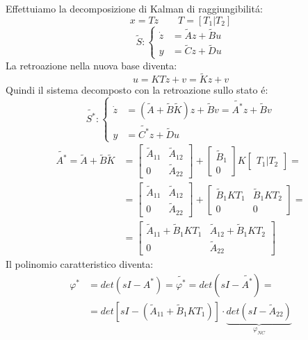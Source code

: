 \documentclass[../main.tex]{subfiles}
\begin{document}
		Effettuiamo la decomposizione di Kalman di raggiungibilit\'a:
		\[ x = Tz \qquad T = [T_1 | T_2] \]
		\[
			\tilde S:
			\begin{cases}
				\dot z &= \tilde Az + \tilde Bu\\
				y &= \tilde Cz + \tilde Du
			\end{cases}
		\]
		La retroazione nella nuova base diventa:
		\[ u = KTz + v = \tilde Kz + v \]
		Quindi il sistema decomposto con la retroazione sullo stato \'e:
		\[
			\tilde{S^{*}}:
			\begin{cases}
				\dot z &= (\tilde A + \tilde B \tilde K)z + \tilde Bv = \tilde{A^{*}}z + \tilde{B} v\\
				y &= \tilde{C^{*}}z + \tilde Du
			\end{cases}
		\]
		\begin{align*}
			\tilde{A^{*}} = \tilde A + \tilde B \tilde K &=
			\begin{bmatrix}
				\tilde A_{11} & \tilde A_{12}\\
				0 & \tilde A_{22}
			\end{bmatrix} +
			\begin{bmatrix}
				\tilde B_{1}\\
				0
			\end{bmatrix} K
			\begin{bmatrix}
				T_1 | T_2
			\end{bmatrix}=
			\\
			&= \begin{bmatrix}
				\tilde A_{11} & \tilde A_{12}\\
				0 & \tilde A_{22}
			\end{bmatrix} +
			\begin{bmatrix}
				\tilde B_1 K T_1 & \tilde B_1 K T_2\\
				0 & 0
			\end{bmatrix}=
			\\
			&= \begin{bmatrix}
				\tilde A_{11} + \tilde B_1 K T_1 & \tilde A_{12} + \tilde B_1 K T_2\\
				0 & \tilde A_{22}
			\end{bmatrix}
		\end{align*}
		Il polinomio caratteristico diventa:
		\begin{align*}
			\varphi^{*} &= det(sI-A^{*}) = \tilde{\varphi^{*}} = det(sI-\tilde{A^{*}}) =\\
			&= det\left[ sI - (\tilde A_{11} + \tilde B_1 K T_1) \right] \cdot \underbrace{det(sI - \tilde A_{22})}_{\varphi_{NC}}
		\end{align*}
		
\end{document}

